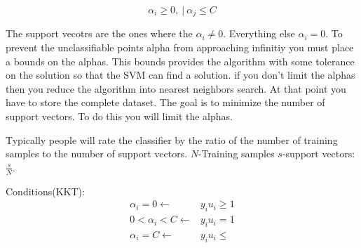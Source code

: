\documentclass[letterpaper, 9pt]{article}
\begin{document}
\begin{equation}
\alpha_i \geq 0, ~|~\alpha_j \leq C
\end{equation}


The support vecotrs are the ones where the $\alpha_i \neq 0$. Everything else $\alpha_i = 0$. To prevent the unclassifiable points alpha from approaching infinitiy you must place a bounds on the alphas. This bounds provides the algorithm with some tolerance on the solution so that the SVM can find a solution. if you don't limit the alphas then you reduce the algorithm into nearest neighbors search. At that point you have to store the complete dataset. The goal is to minimize the number of support vectors. To do this you will limit the alphas.

Typically people will rate the classifier by the ratio of the number of training samples to the number of support vectors. $N$-Training samples $s$-support vectors: $\frac{s}{N}$.

Conditions(KKT):
\begin{equation}
\begin{split}
\alpha_i = 0 \leftarrow& y_iu_i \geq 1\\
0 < \alpha_i < C \leftarrow& y_iu_i = 1 \\
\alpha_i = C \leftarrow& y_i u_i \leq
\end{split}
\end{equation}
\end{document}
